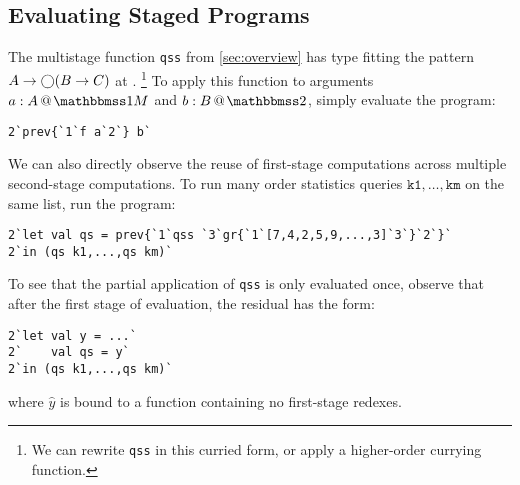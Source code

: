 \subsection{Evaluating Staged Programs}

The multistage function \texttt{qss} from \ref{sec:overview} has
type fitting the pattern \mbox{$A\to \bigcirc (B \to C)$} at \bbonem.%
\footnote{We can rewrite \texttt{qss} in this curried form, or apply a
higher-order currying function.} 
To apply this function to arguments $\colmix a A$ and $\coltwo b B$, simply
evaluate the program:
\begin{lstlisting}
2`prev{`1`f a`2`} b`
\end{lstlisting}

We can also directly observe the reuse of first-stage computations across
multiple second-stage computations. To run many order statistics queries
$\texttt{k1},\dots,\texttt{km}$ on the same list, run the program:
\begin{lstlisting}
2`let val qs = prev{`1`qss `3`gr{`1`[7,4,2,5,9,...,3]`3`}`2`}`
2`in (qs k1,...,qs km)`
\end{lstlisting}
To see that the partial application of \texttt{qss} is only evaluated once,
observe that after the first stage of evaluation, the residual has the form:
\begin{lstlisting}
2`let val y = ...`
2`    val qs = y`
2`in (qs k1,...,qs km)`
\end{lstlisting}
where $\hat{y}$ is bound to a function containing no first-stage redexes.
